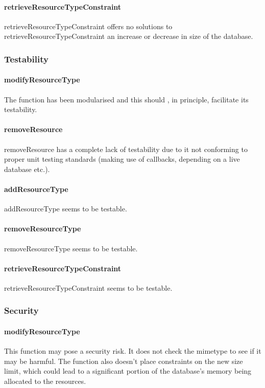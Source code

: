 \documentclass[a4paper]{article}
\begin{document}
\paragraph{retrieveResourceTypeConstraint}
retrieveResourceTypeConstraint offers no solutions to retrieveResourceTypeConstraint an increase or decrease in size of the database.

\subsubsection {Testability}

\paragraph{modifyResourceType}
The function has been modularised and this should , in principle, facilitate its testability.

\paragraph{removeResource}
removeResource has a complete lack of testability due to it not conforming to proper unit testing standards (making use of callbacks, depending on a live database etc.).

\paragraph{addResourceType}
addResourceType seems to be testable.

\paragraph{removeResourceType}
removeResourceType seems to be testable.

\paragraph{retrieveResourceTypeConstraint}
retrieveResourceTypeConstraint seems to be testable.

\subsubsection {Security}

\paragraph{modifyResourceType}
This function may pose a security risk. It does not check the mimetype to see if it may be harmful. The function also doesn’t place constraints on the new size limit, which could lead to a significant portion of the database’s memory being allocated to the resources.
\end{document}
